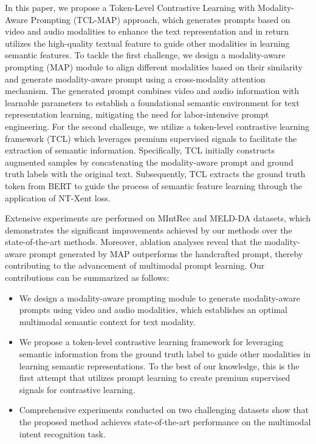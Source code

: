 \documentclass[letterpaper]{article}
\begin{document}
In this paper, we propose a Token-Level Contrastive Learning with Modality-Aware Prompting (TCL-MAP) approach, which generates prompts based on video and audio modalities to enhance the text representation and in return utilizes the high-quality textual feature to guide other modalities in learning semantic features. To tackle the first challenge, we design a modality-aware prompting (MAP) module to align different modalities based on their similarity and generate modality-aware prompt using a cross-modality attention mechanism. The generated prompt combines video and audio information with learnable parameters to establish a foundational semantic environment for text representation learning, mitigating the need for labor-intensive prompt engineering. For the second challenge, we utilize a token-level contrastive learning framework (TCL) which leverages premium supervised signals to facilitate the extraction of semantic information. Specifically, TCL initially constructs augmented samples by concatenating the modality-aware prompt and ground truth labels with the original text. Subsequently, TCL extracts the ground truth token from BERT \cite{devlin2018bert} to guide the process of semantic feature learning through the application of NT-Xent \cite{sohn2016improved} loss.


Extensive experiments are performed on MIntRec \cite{10.1145/3503161.3547906} and MELD-DA \cite{saha-etal-2020-towards} datasets, which demonstrates the significant improvements achieved by our methods over the state-of-the-art methods. Moreover, ablation analyses reveal that the modality-aware prompt generated by MAP outperforms the handcrafted prompt, thereby contributing to the advancement of multimodal prompt learning. Our contributions can be summarized as follows:

\begin{itemize}
\item We design a modality-aware prompting module to generate modality-aware prompts using video and audio modalities, which establishes an optimal multimodal semantic context for text modality.

\item We propose a token-level contrastive learning framework for leveraging semantic information from the ground truth label to guide other modalities in learning semantic representations. To the best of our knowledge, this is the first attempt that utilizes prompt learning to create premium supervised signals for contrastive learning.

\item Comprehensive experiments conducted on two challenging datasets show that the proposed method achieves state-of-the-art performance on the multimodal intent recognition task.
\end{itemize}
\end{document}
